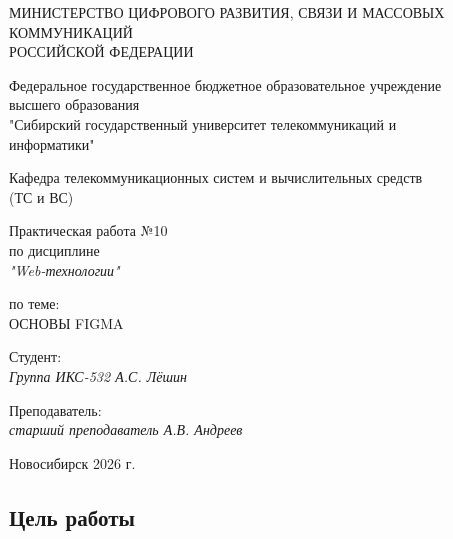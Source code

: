 \documentclass[a4paper,14pt,oneside,openany]{memoir}
\begin{document}
\thispagestyle{empty}

\begin{center}
    МИНИСТЕРСТВО ЦИФРОВОГО РАЗВИТИЯ, СВЯЗИ И МАССОВЫХ \\ КОММУНИКАЦИЙ \\ РОССИЙСКОЙ ФЕДЕРАЦИИ

    \vspace{20pt}

    Федеральное государственное бюджетное образовательное учреждение \\ высшего образования \\
    "Сибирский государственный университет телекоммуникаций и \\ информатики"

    \vspace{20pt}

    Кафедра телекоммуникационных систем и вычислительных средств \\ (ТС и ВС)
\end{center}

\vfill

\begin{center}
    Практическая работа №10 \\
    по дисциплине \\
    \textit{"Web-технологии"}

    \vspace{20pt}

    по теме: \\
    \uppercase{Основы Figma}
\end{center}

\vfill

\noindent Студент: \\
\textit{Группа ИКС-532 \hfill А.С. Лёшин}

\vspace{20pt}

\noindent Преподаватель: \\
\textit{старший преподаватель \hfill А.В. Андреев}

\vfill

\begin{center}
    Новосибирск 2026 г.
\end{center}

\newpage
\setcounter{page}{2}
\OnehalfSpacing*

\subsection*{Цель работы}
\end{document}
